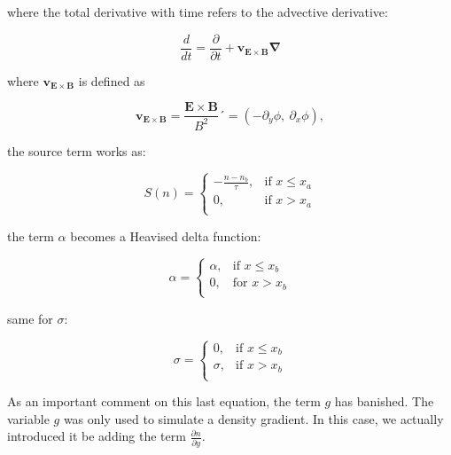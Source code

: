 \documentclass{hitec} %
\begin{document}
where the total derivative with time refers to the advective derivative:

\begin{equation}
\frac{d}{dt} = \frac{\partial}{\partial t} + \boldsymbol{v_{E\times B} \nabla}
\end{equation}

where $\boldsymbol{v_{E\times B}}$ is defined as

\begin{equation}
\boldsymbol{v_{E\times B}} = \frac{\boldsymbol{E\times B}}{ B^2}´ = (-\partial_y\phi,~\partial_x\phi),
\end{equation}

the source term works as:

\begin{equation}
S(n) =
 \left\{\begin{array}{lr}
        -\frac{n - n_b}{\tau}, & \text{if } x\leq x_a\\
        0, & \text{if } x > x_a\\
        \end{array}\right.
\end{equation}

the term $\alpha$ becomes a Heavised delta function:

\begin{equation}
\alpha =
 \left\{\begin{array}{lr}
        \alpha, & \text{if } x\leq x_b\\
        0, & \text{for } x > x_b\\
        \end{array}\right.
\end{equation}

same for $\sigma$:

\begin{equation}
\sigma =
 \left\{\begin{array}{lr}
        0, & \text{if } x\leq x_b\\
        \sigma, & \text{if } x > x_b\\
        \end{array}\right.
\end{equation}

As an important comment on this last equation, the term $g$ has banished. The variable $g$ was only used to simulate a density gradient. In this case, we actually introduced it be adding the term $\frac{\partial n}{\partial y}$.
\end{document}
